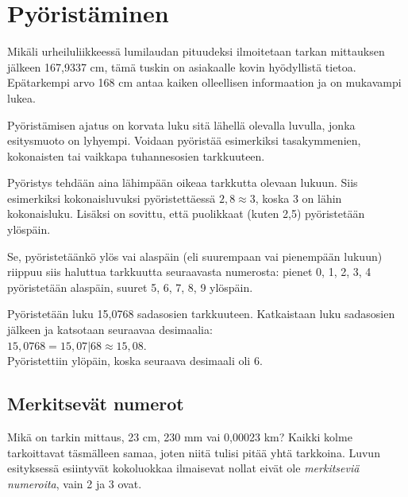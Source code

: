 \section{Pyöristäminen}

Mikäli urheiluliikkeessä lumilaudan pituudeksi ilmoitetaan tarkan mittauksen jälkeen 167,9337 cm, tämä tuskin on asiakaalle kovin hyödyllistä tietoa. Epätarkempi arvo 168 cm antaa kaiken olleellisen informaation ja on mukavampi lukea.

Pyöristämisen ajatus on korvata luku sitä lähellä olevalla luvulla, jonka esitysmuoto on lyhyempi. Voidaan pyöristää
esimerkiksi tasakymmenien, kokonaisten tai vaikkapa tuhannesosien
tarkkuuteen.

Pyöristys tehdään aina lähimpään oikeaa tarkkutta olevaan lukuun. Siis esimerkiksi kokonaisluvuksi pyöristettäessä $2,8 \approx 3$, koska 3 on lähin kokonaisluku. Lisäksi on sovittu, että
puolikkaat (kuten 2,5) pyöristetään ylöspäin.

Se, pyöristetäänkö ylös vai alaspäin (eli suurempaan vai
pienempään lukuun) riippuu siis haluttua tarkkuutta
seuraavasta numerosta: pienet
0, 1, 2, 3, 4 pyöristetään alaspäin, suuret 5, 6, 7, 8, 9 ylöspäin.

\begin{esimerkki}
Pyöristetään luku 15,0768 sadasosien tarkkuuteen. Katkaistaan
luku sadasosien jälkeen ja katsotaan seuraavaa desimaalia:\\
$15,0768 = 15,07|68 \approx 15,08$.\\
Pyöristettiin ylöpäin, koska seuraava desimaali oli 6.
\end{esimerkki}


\subsection*{Merkitsevät numerot}

Mikä on tarkin mittaus, 23 cm, 230 mm vai 0,00023 km? Kaikki kolme tarkoittavat täsmälleen samaa, joten niitä tulisi pitää
yhtä tarkkoina. Luvun esityksessä esiintyvät kokoluokkaa ilmaisevat nollat eivät ole \emph{merkitseviä numeroita}, vain
2 ja 3 ovat.





